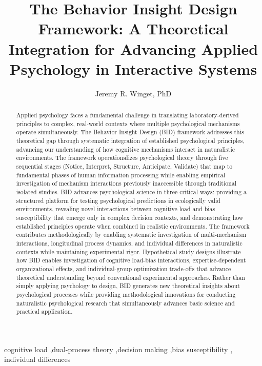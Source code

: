 \documentclass[
  authoryear,
  preprint]{elsarticle}
\begin{document}
\begin{frontmatter}
\title{The Behavior Insight Design Framework: A Theoretical Integration
for Advancing Applied Psychology in Interactive Systems}
\author[1]{Jeremy R. Winget, PhD%
%
}



        
\begin{abstract}
Applied psychology faces a fundamental challenge in translating
laboratory-derived principles to complex, real-world contexts where
multiple psychological mechanisms operate simultaneously. The Behavior
Insight Design (BID) framework addresses this theoretical gap through
systematic integration of established psychological principles,
advancing our understanding of how cognitive mechanisms interact in
naturalistic environments. The framework operationalizes psychological
theory through five sequential stages (Notice, Interpret, Structure,
Anticipate, Validate) that map to fundamental phases of human
information processing while enabling empirical investigation of
mechanism interactions previously inaccessible through traditional
isolated studies. BID advances psychological science in three critical
ways: providing a structured platform for testing psychological
predictions in ecologically valid environments, revealing novel
interactions between cognitive load and bias susceptibility that emerge
only in complex decision contexts, and demonstrating how established
principles operate when combined in realistic environments. The
framework contributes methodologically by enabling systematic
investigation of multi-mechanism interactions, longitudinal process
dynamics, and individual differences in naturalistic contexts while
maintaining experimental rigor. Hypothetical study designs illustrate
how BID enables investigation of cognitive load-bias interactions,
expertise-dependent organizational effects, and individual-group
optimization trade-offs that advance theoretical understanding beyond
conventional experimental approaches. Rather than simply applying
psychology to design, BID generates new theoretical insights about
psychological processes while providing methodological innovations for
conducting naturalistic psychological research that simultaneously
advances basic science and practical application.
\end{abstract}





\begin{keyword}
    cognitive load \sep dual-process theory \sep decision
making \sep bias susceptibility \sep 
    individual differences
\end{keyword}
\end{frontmatter}
    
\end{document}

